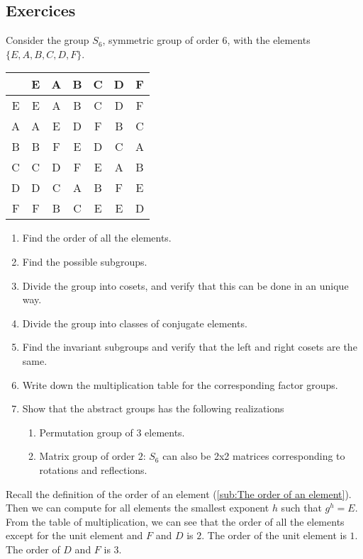 
\subsection{Exercices} %
\label{sub:Exercices}

Consider the group $S_6$, symmetric group of order $6$, with the elements
$\{E, A, B, C, D, F\}$.
\begin{center}
\begin{tabular}{ c|c c c c c c }
  & E & A & B & C & D & F \\
 \hline
    E & E & A & B & C & D & F \\
    A & A & E & D & F & B & C \\
    B & B & F & E & D & C & A \\
    C & C & D & F & E & A & B \\
    D & D & C & A & B & F & E \\
    F & F & B & C & E & E & D
\end{tabular}
\end{center}

\begin{enumerate}
    \item Find the order of all the elements.
    \item Find the possible subgroups.
    \item Divide the group into cosets, and verify that this can be done in an
        unique way.
    \item Divide the group into classes of conjugate elements.
    \item Find the invariant subgroups and verify that the left and right
        cosets are the same.
    \item Write down the multiplication table for the corresponding factor
        groups.
    \item Show that the abstract groups has the following realizations

        \begin{enumerate}
            \item Permutation group of $3$ elements.
            \item Matrix group of order $2$: $S_6$ can also be 2x2 matrices
                corresponding to rotations and reflections.
        \end{enumerate}
\end{enumerate}

Recall the definition of the order of an element
(\autoref{sub:The order of an element}).
Then we can compute for all elements the smallest exponent $h$ such that $g^h=E$.
From the table of multiplication, we can see that the order of all the elements
except for the unit element and $F$ and $D$ is $2$. The order of the unit
element is $1$. The order of $D$ and $F$ is $3$.

